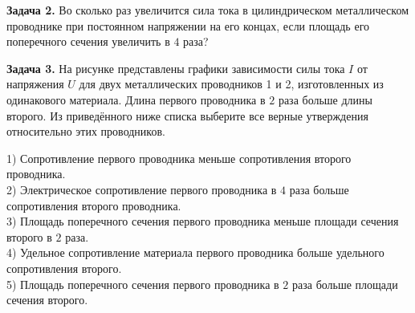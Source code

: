 \begin{taskbasic}[code={\label{task:elem_ohm_v24_n11}}]
\textbf{Задача 2.} Во сколько раз увеличится сила тока в цилиндрическом металлическом проводнике при постоянном напряжении на его концах, если площадь его поперечного сечения увеличить в $4$ раза?

\end{taskbasic}

\begin{taskbasic}[code={\label{task:elem_ohm_v25_n15}}]
\textbf{Задача 3.} На рисунке представлены графики зависимости силы тока $I$ от напряжения $U$ для двух металлических проводников 1 и 2, изготовленных из одинакового материала. Длина первого проводника в $2$ раза больше длины второго. Из приведённого ниже списка выберите все верные утверждения относительно этих проводников.

\nopagebreak\smallskip
\begin{center}
\end{center}

1) Сопротивление первого проводника меньше сопротивления второго проводника.\\
2) Электрическое сопротивление первого проводника в $4$ раза больше сопротивления второго проводника.\\
3) Площадь поперечного сечения первого проводника меньше площади сечения второго в $2$ раза.\\
4) Удельное сопротивление материала первого проводника больше удельного сопротивления второго.\\
5) Площадь поперечного сечения первого проводника в $2$ раза больше площади сечения второго.

\end{taskbasic}
